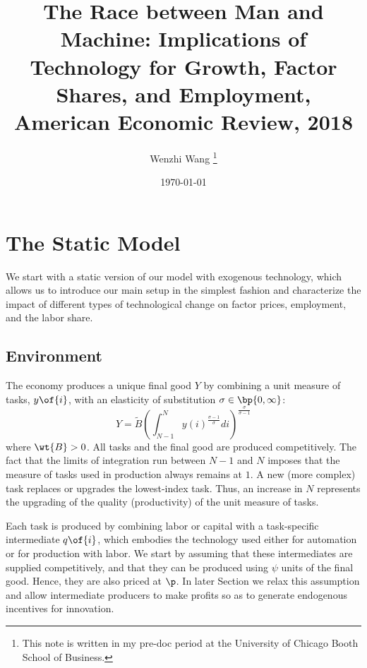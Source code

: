\documentclass[12pt]{article}
\theoremstyle{definition}
\begin{document}

\title{\bf The Race between Man and Machine: Implications of Technology for Growth, Factor Shares, and Employment, American Economic Review, 2018}
\author{Wenzhi Wang \thanks{This note is written in my pre-doc period at the University of Chicago Booth School of Business.} } 
\date{\today}
\maketitle

\citet{acemogluRaceManMachine2018}

\section{The Static Model}

We start with a static version of our model with exogenous technology, which allows us to introduce our main setup in the simplest fashion and characterize the impact of different types of technological change on factor prices, employment, and the labor share.

\subsection{Environment}

The economy produces a unique final good $Y$ by combining a unit measure of tasks, $y\of{i}$, with an elasticity of substitution $\sigma \in \bp{0, \infty}$:
\begin{equation}
    \label{eq: overall_production_function}
	Y = \widetilde{B}\left(\int_{N-1}^N y(i)^{\frac{\sigma-1}{\sigma}} d i\right)^{\frac{\sigma}{\sigma-1}}
\end{equation}
where $\wt{B} > 0$. All tasks and the final good are produced competitively. The fact that the limits of integration run between $N-1$ and $N$ imposes that the measure of tasks used in production always remains at $1$. A new (more complex) task replaces or upgrades the lowest-index task. Thus, an increase in $N$ represents the upgrading of the quality (productivity) of the unit measure of tasks.

Each task is produced by combining labor or capital with a task-specific intermediate $q\of{i}$, which embodies the technology used either for automation or for production with labor. We start by assuming that these intermediates are supplied competitively, and that they can be produced using $\psi$ units of the final good. Hence, they are also priced at $\p$. In later Section we relax this assumption and allow intermediate producers to make profits so as to generate endogenous incentives for innovation.
\end{document}
